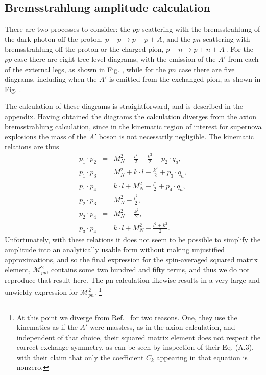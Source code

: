 \documentclass[nofootinbib,aps,prd,preprint,superscriptaddress]{revtex4}
\newcommand{\bea}{\begin{eqnarray}}
\newcommand{\eea}{\end{eqnarray}}
\begin{document}
\subsection{Bremsstrahlung amplitude calculation}
	 There are two processes to consider: the $pp$ scattering with the bremsstrahlung of the dark photon off the proton, $ p+p \rightarrow p+p+A$, and the $pn$ scattering with bremsstrahlung off the proton or the charged pion, $ p+n \rightarrow p+n+A\ $. For the $pp$ case there are eight tree-level diagrams, with the emission of the $A'$ from each of the external legs, as shown in Fig. , while for the $pn$ case there are five diagrams, including when the $A'$ is emitted from the exchanged pion, as shown in Fig. .
	
The calculation of these diagrams is straightforward, and is described in the appendix. Having obtained the diagrams the calculation diverges from the axion bremsstrahlung calculation, since in the kinematic region of interest for supernova explosions the mass of the $A'$ boson is not necessarily negligible. The kinematic relations are thus \bea 
p_1 \cdot p_2 &=& M_N^2 - \frac{l^2}{2} - \frac{k^2}{2} + p_2 \cdot q_a,\\
p_1 \cdot p_3 &=& M_N^2 + k \cdot l - \frac{k^2}{2} + p_3 \cdot q_a,\\  
p_1 \cdot p_4 &=& k \cdot l + M_N^2 - \frac{l^2}{2} + p_4 \cdot q_a, \\
p_2 \cdot p_3 &=& M_N^2 - \frac{l^2}{2}, \\ 
p_2 \cdot p_4 &=& M_N^2 - \frac{k^2}{2},\\
p_3 \cdot p_4 &=& k \cdot l + M_N^2 - \frac{l^2 + k^2}{2}.
\eea
Unfortunately, with these relations it does not seem to be possible to simplify the amplitude into an analytically usable form without making unjustified approximations, and so the final expression for the spin-averaged squared matrix element, $ \mathcal{M}^2_{pp}$, contains some two hundred and fifty terms, and thus we do not reproduce that result here. The pn calculation likewise results in a very large and unwieldy expression for $ \mathcal{M}^2_{pn}$. \footnote{At this point we diverge from Ref.~\cite{Dent:2012mx} for two reasons.  One, they use the kinematics as if the $A'$ were massless, as in the axion calculation, and independent of that choice, their squared matrix element does not respect the correct exchange symmetry, as can be seen by inspection of their Eq. (A.3), with their claim that only the coefficient $C_k$ appearing in that equation is nonzero.}
\end{document}
